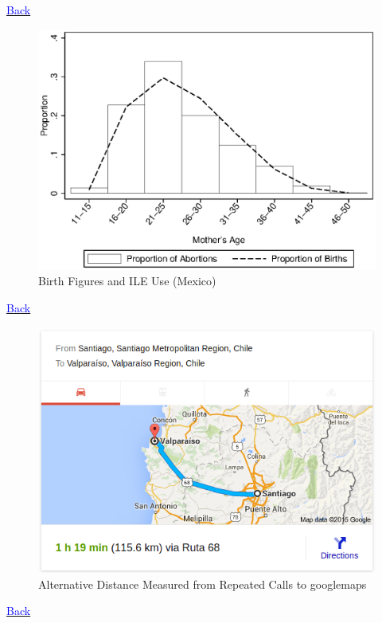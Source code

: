 \documentclass[10pt,letterpaper,subeqn]{beamer}
\begin{document}
\begin{frame}[label=ChileDesc]

\hyperlink{empirA}{\textcolor{blue}{Back}}
\end{frame}

\begin{frame}[label=MexicoDesc]

\end{frame}

\begin{frame}[label=empirA1]
\begin{figure}
\begin{center}
\caption{Birth Figures and ILE Use (Mexico)}
\includegraphics[scale=0.7]{./figures/birthDescriptives.eps}
\end{center}
\end{figure}
\hyperlink{empirB}{\textcolor{blue}{Back}}
\end{frame}


\begin{frame}[label=distance]
\begin{figure}
\begin{center}
\caption{Alternative Distance Measured from Repeated Calls to googlemaps}
\includegraphics[scale=0.5]{./figures/mapDistance.png}
\end{center}
\end{figure}
\hyperlink{robust}{\textcolor{blue}{Back}}
\end{frame}
\end{document}

